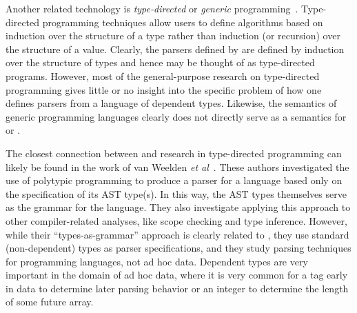 
Another related technology is {\em type-directed} or
{\em generic} programming~\cite{jeuring+:polytypic-programming,hinze+:generic-programming,lammel+:syb}.  Type-directed programming techniques allow users to
define algorithms based on induction over the structure of a type rather 
than induction (or recursion) over the structure of a value.  Clearly,
the parsers defined by \ddc{} are defined by induction over the structure
of types and hence may be thought of as type-directed programs.  
However, most of the general-purpose research on type-directed programming
gives little or no insight into the specific problem of 
how one defines parsers from a language of dependent types.
Likewise, the semantics of generic programming languages clearly does
not directly serve as a semantics for \padsc{} or \padsml{}.

The closest connection between \ddc{} and research in
type-directed programming can likely be found in the work of 
van Weelden \textit{et al}~\cite{weelden+:polytypic-ast}.
These authors investigated the use of
polytypic programming to produce a parser for a language based only on
the specification of its AST type(s). In this way, the AST types
themselves serve as the grammar for the language. They also
investigate applying this approach to other compiler-related analyses,
like scope checking and type inference.  However, while their
``types-as-grammar'' approach is clearly related to \padsml{}, they
use standard (non-dependent) types as parser specifications, and they
study parsing techniques for programming languages, not ad hoc data.
Dependent types are very important in the domain of ad hoc data,
where it is very common for a tag early in data to determine later parsing 
behavior or an integer to determine the length of some future array.



